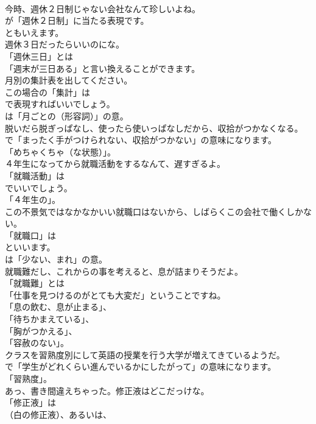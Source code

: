 \documentclass[8pt]{extreport}
\begin{document}
\begin{CJK}{UTF8}{min}
\\	今時、週休２日制じゃない会社なんて珍しいよね。 
\\	が「週休２日制」に当たる表現です。
\\	ともいえます。	
\\	週休３日だったらいいのにな。 
\\	「週休三日」とは
\\	「週末が三日ある」と言い換えることができます。	
\\	月別の集計表を出してください。 
\\	この場合の「集計」は
\\	で表現すればいいでしょう。
\\	は「月ごとの（形容詞）」の意。	
\\	脱いだら脱ぎっぱなし、使ったら使いっぱなしだから、収拾がつかなくなる。 
\\	で「まったく手がつけられない、収拾がつかない」の意味になります。
\\	「めちゃくちゃ（な状態）」。	
\\	４年生になってから就職活動をするなんて、遅すぎるよ。 
\\	「就職活動」は
\\	でいいでしょう。
\\	「４年生の」。	
\\	この不景気ではなかなかいい就職口はないから、しばらくこの会社で働くしかない。 
\\	「就職口」は
\\	といいます。
\\	は「少ない、まれ」の意。	
\\	就職難だし、これからの事を考えると、息が詰まりそうだよ。 
\\	「就職難」とは
\\	「仕事を見つけるのがとても大変だ」ということですね。
\\	「息の飲む、息が止まる」、
\\	「待ちかまえている」、
\\	「胸がつかえる」、
\\	「容赦のない」。	
\\	クラスを習熟度別にして英語の授業を行う大学が増えてきているようだ。 
\\	で「学生がどれくらい進んでいるかにしたがって」の意味になります。
\\	「習熟度」。	
\\	あっ、書き間違えちゃった。修正液はどこだっけな。 
\\	「修正液」は
\\	（白の修正液）、あるいは、

\end{CJK}
\end{document}

